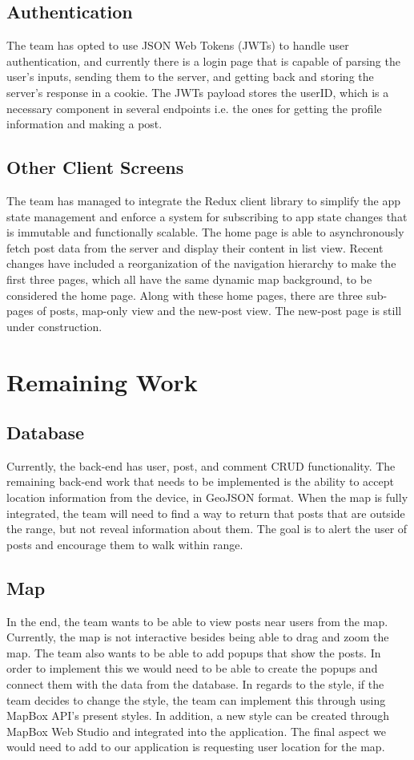 \documentclass[draftclsnofoot, onecolumn, letterpaper,10pt,compsoc]{IEEEtran}
\begin{document}
\pagebreak

\subsection{Authentication}
The team has opted to use JSON Web Tokens (JWTs) to handle user authentication, and currently there is a login page that is capable of parsing the user's inputs, sending them to the server, and getting back and storing the server's response in a cookie. The JWTs payload stores the userID, which is a necessary component in several endpoints i.e. the ones for getting the profile information and making a post.

\subsection{Other Client Screens}
The team has managed to integrate the Redux client library to simplify the app state management and enforce a system for subscribing to app state changes that is immutable and functionally scalable. The home page is able to asynchronously fetch post data from the server and display their content in list view. Recent changes have included a reorganization of the navigation hierarchy to make the first three pages, which all have the same dynamic map background, to be considered the home page. Along with these home pages, there are three sub-pages of posts, map-only view and the new-post view. The new-post page is still under construction.

\section{Remaining Work}
\subsection{Database}
Currently, the back-end has user, post, and comment CRUD functionality.  The remaining back-end work that needs to be implemented is the ability to accept location information from the device, in GeoJSON format.  When the map is fully integrated, the team will need to find a way to return that posts that are outside the range, but not reveal information about them.  The goal is to alert the user of posts and encourage them to walk within range.

\subsection{Map}
In the end, the team wants to be able to view posts near users from the map. Currently, the map is not interactive besides being able to drag and zoom the map. The team also wants to be able to add popups that show the posts. In order to implement this we would need to be able to create the popups and connect them with the data from the database. In regards to the style, if the team decides to change the style, the team can implement this through using MapBox API's present styles. In addition, a new style can be created through MapBox Web Studio and integrated into the application. The final aspect we would need to add to our application is requesting user location for the map.
\end{document}
